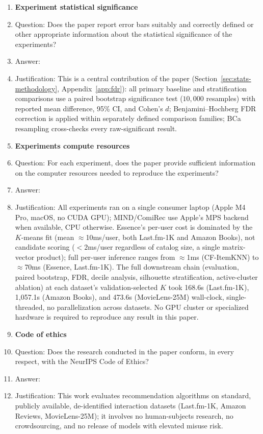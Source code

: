\documentclass{article}
\begin{document}
\begin{enumerate}
\item {\bf Experiment statistical significance}
    \item[] Question: Does the paper report error bars suitably and correctly defined or other appropriate information about the statistical significance of the experiments?
    \item[] Answer: \answerYes{}
    \item[] Justification: This is a central contribution of the paper (Section~\ref{sec:stats-methodology}, Appendix~\ref{app:fdr}): all primary baseline and stratification comparisons use a paired bootstrap significance test ($10{,}000$ resamples) with reported mean difference, 95\% CI, and Cohen's $d$; Benjamini--Hochberg FDR correction is applied within separately defined comparison families; BCa resampling cross-checks every raw-significant result.

\item {\bf Experiments compute resources}
    \item[] Question: For each experiment, does the paper provide sufficient information on the computer resources needed to reproduce the experiments?
    \item[] Answer: \answerYes{}
    \item[] Justification: All experiments ran on a single consumer laptop (Apple M4 Pro, macOS, no CUDA GPU); MIND/ComiRec use Apple's MPS backend when available, CPU otherwise. Essence's per-user cost is dominated by the $K$-means fit (mean $\approx$10ms/user, both Last.fm-1K and Amazon Books), not candidate scoring ($<2$ms/user regardless of catalog size, a single matrix-vector product); full per-user inference ranges from $\approx$1ms (CF-ItemKNN) to $\approx$70ms (Essence, Last.fm-1K). The full downstream chain (evaluation, paired bootstrap, FDR, decile analysis, silhouette stratification, active-cluster ablation) at each dataset's validation-selected $K$ took 168.6s (Last.fm-1K), 1{,}057.1s (Amazon Books), and 473.6s (MovieLens-25M) wall-clock, single-threaded, no parallelization across datasets. No GPU cluster or specialized hardware is required to reproduce any result in this paper.

\item {\bf Code of ethics}
    \item[] Question: Does the research conducted in the paper conform, in every respect, with the NeurIPS Code of Ethics?
    \item[] Answer: \answerYes{}
    \item[] Justification: This work evaluates recommendation algorithms on standard, publicly available, de-identified interaction datasets (Last.fm-1K, Amazon Reviews, MovieLens-25M); it involves no human-subjects research, no crowdsourcing, and no release of models with elevated misuse risk.


\end{enumerate}
\end{document}

